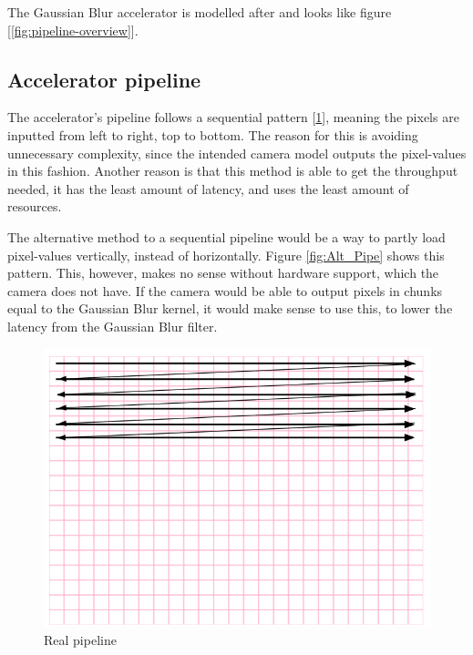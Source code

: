 The Gaussian Blur accelerator is modelled after \cite{cong2014optimal} and looks like figure [\ref{fig:pipeline-overview}].

\subsection{Accelerator pipeline}
The accelerator's pipeline follows a sequential pattern [\ref{fig:Real_Pipe}], meaning the pixels are inputted from left to right, top to bottom. The reason for this is avoiding unnecessary complexity, since the intended camera model outputs the pixel-values in this fashion. Another reason is that this method is able to get the throughput needed, it has the least amount of latency, and uses the least amount of resources.

The alternative method to a sequential pipeline would be a way to partly load pixel-values vertically, instead of horizontally. Figure \ref{fig:Alt_Pipe} shows this pattern. This, however, makes no sense without hardware support, which the camera does not have. If the camera would be able to output pixels in chunks equal to the Gaussian Blur kernel, it would make sense to use this, to lower the latency from the Gaussian Blur filter.
\begin{figure}
    \centering
    \includegraphics[scale=0.4]{Images/real_pipeline.png}
    \caption{Real pipeline}
    \label{fig:Real_Pipe}
\end{figure}

